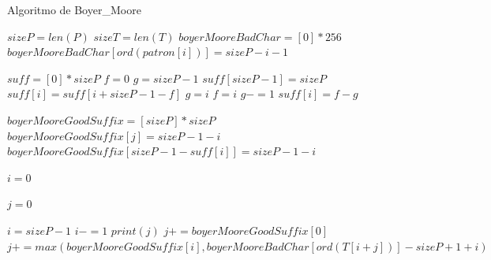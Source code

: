 \begin{algorithm} [H]
    \caption{Algoritmo de Boyer\_Moore}\label{alg:BM}
    \begin{algorithmic} [1]
            \State $sizeP = len(P)$
            \State $sizeT = len(T)$
            \State $boyerMooreBadChar = [0] * 256$ 
                \State $boyerMooreBadChar[ord(patron[i])] = sizeP - i - 1$
            \EndFor
            
            \State $suff = [0] * sizeP$
            \State $f = 0$
            \State $g = sizeP -1$
            \State $suff[sizeP -1] = sizeP$
                    \State $suff[i] = suff[i + sizeP -1 -f]$
                \Else
                        \State $g = i$
                    \EndIf
                    \State $f = i$
                        \State $g -= 1$
                    \EndWhile
                    \State $suff[i] = f - g$
                \EndIf
            \EndFor

            \State $boyerMooreGoodSuffix = [sizeP] * sizeP$
                            \State $boyerMooreGoodSuffix[j] = sizeP - 1 - i$
                        \EndIf
                    \EndFor
                \EndIf
            \EndFor
                \State $boyerMooreGoodSuffix[sizeP - 1 - suff[i]] = sizeP - 1 - i$
            \EndFor

            \State $i = 0$
    \end{algorithmic}
\end{algorithm}

\begin{algorithm} [H]
    \begin{algorithmic} [1]
                \State $j = 0$

                \State $i = sizeP - 1$
                    \State $i -= 1$
                \EndWhile
                    \State $print(j)$
                    \State $j += boyerMooreGoodSuffix[0]$
                \Else
                    \State $j += max(boyerMooreGoodSuffix[i], boyerMooreBadChar[ord(T[i+j])] - sizeP + 1 + i)$
                \EndIf
            \EndWhile
        \EndProcedure
    \end{algorithmic}
\end{algorithm}


